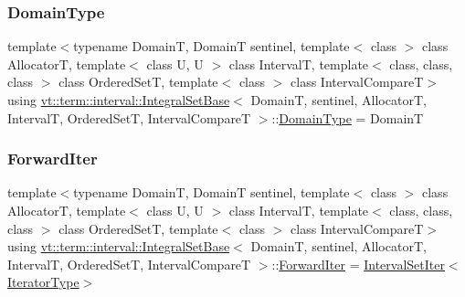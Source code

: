 \mbox{\label{structvt_1_1term_1_1interval_1_1_integral_set_base_a74b3ffb0498e75459e23d59b2d4facfa}} 
\subsubsection{\texorpdfstring{Domain\+Type}{DomainType}}
{\footnotesize\ttfamily template$<$typename DomainT, DomainT sentinel, template$<$ class $>$ class AllocatorT, template$<$ class U, U $>$ class IntervalT, template$<$ class, class, class $>$ class Ordered\+SetT, template$<$ class $>$ class Interval\+CompareT$>$ \\
using \hyperlink{structvt_1_1term_1_1interval_1_1_integral_set_base}{vt\+::term\+::interval\+::\+Integral\+Set\+Base}$<$ DomainT, sentinel, AllocatorT, IntervalT, Ordered\+SetT, Interval\+CompareT $>$\+::\hyperlink{structvt_1_1term_1_1interval_1_1_integral_set_base_a74b3ffb0498e75459e23d59b2d4facfa}{Domain\+Type} =  DomainT}

\mbox{\label{structvt_1_1term_1_1interval_1_1_integral_set_base_abd0d7f40a96384d2db0a2782a8921a34}} 
\subsubsection{\texorpdfstring{Forward\+Iter}{ForwardIter}}
{\footnotesize\ttfamily template$<$typename DomainT, DomainT sentinel, template$<$ class $>$ class AllocatorT, template$<$ class U, U $>$ class IntervalT, template$<$ class, class, class $>$ class Ordered\+SetT, template$<$ class $>$ class Interval\+CompareT$>$ \\
using \hyperlink{structvt_1_1term_1_1interval_1_1_integral_set_base}{vt\+::term\+::interval\+::\+Integral\+Set\+Base}$<$ DomainT, sentinel, AllocatorT, IntervalT, Ordered\+SetT, Interval\+CompareT $>$\+::\hyperlink{structvt_1_1term_1_1interval_1_1_integral_set_base_abd0d7f40a96384d2db0a2782a8921a34}{Forward\+Iter} =  \hyperlink{structvt_1_1term_1_1interval_1_1_integral_set_base_1_1_interval_set_iter}{Interval\+Set\+Iter}$<$\hyperlink{structvt_1_1term_1_1interval_1_1_integral_set_base_a111b2ec1ea960a40ba4270be702f11f1}{Iterator\+Type}$>$}

